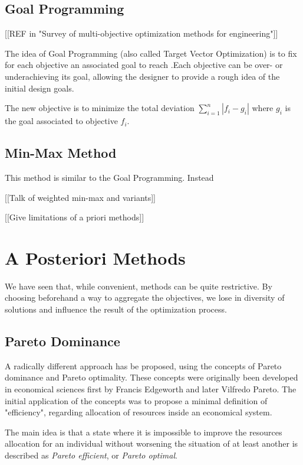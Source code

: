 \subsection{Goal Programming}

[[REF in "Survey of multi-objective optimization methods for engineering"]]

The idea of Goal Programming (also called Target Vector Optimization) is to fix for each objective an associated goal to reach .Each objective can be over- or underachieving its goal, allowing the designer to provide a rough idea of the initial design goals.

The new objective is to minimize the total deviation $\sum_{i=1}^n |f_i - g_i|$ where $g_i$ is the goal associated to objective $f_i$.

\subsection{Min-Max Method}

This method is similar to the Goal Programming. Instead 

[[Talk of weighted min-max and variants]]

[[Give limitations of a priori methods]]

\section{A Posteriori Methods}

We have seen that, while convenient,  methods can be quite restrictive. By choosing beforehand a way to aggregate the objectives, we lose in diversity of solutions and influence the result of the optimization process.

\subsection{Pareto Dominance}

A radically different approach has be proposed, using the concepts of Pareto dominance and Pareto optimality. These concepts were originally been developed in economical sciences first by Francis Edgeworth and later Vilfredo Pareto. The initial application of the concepts was to propose a minimal definition of "efficiency", regarding allocation of resources inside an economical system.

The main idea is that a state where it is impossible to improve the resources allocation for an individual without worsening the situation of at least another is described as \emph{Pareto efficient}, or \emph{Pareto optimal}.

